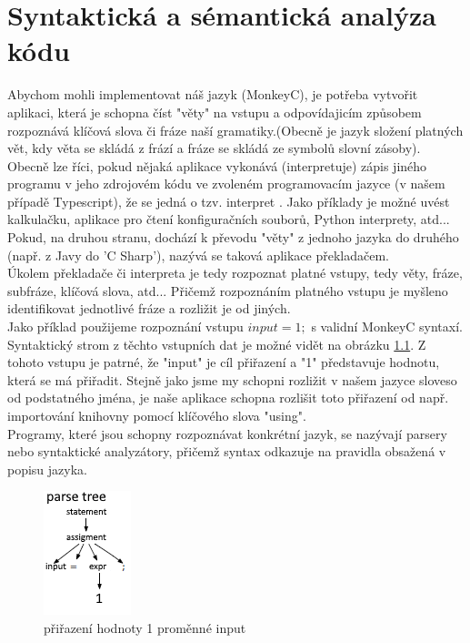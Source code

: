 \chapter{Syntaktická a sémantická analýza kódu}
Abychom mohli implementovat náš jazyk (MonkeyC), je potřeba vytvořit aplikaci, která je schopna číst "věty" na vstupu a odpovídajicím způsobem rozpoznává klíčová slova či fráze naší gramatiky.(Obecně je jazyk složení platných vět, kdy věta se skládá z frází a fráze se skládá ze symbolů slovní zásoby).\\
Obecně lze říci, pokud nějaká aplikace vykonává (interpretuje) zápis jiného programu v jeho zdrojovém kódu ve zvoleném programovacím jazyce (v našem případě Typescript), že se jedná o tzv. interpret \cite{Interpret_2020}. Jako příklady je možné uvést kalkulačku, aplikace pro čtení konfiguračních souborů, Python interprety, atd... Pokud, na druhou stranu, dochází k převodu "věty" z jednoho jazyka do druhého (např. z Javy do 'C Sharp'), nazývá se taková aplikace překladačem.\\
Úkolem překladače či interpreta je tedy rozpoznat platné vstupy, tedy věty, fráze, subfráze, klíčová slova, atd... Přičemž rozpoznáním platného vstupu je myšleno identifikovat jednotlivé fráze a rozližit je od jiných.\\
Jako příklad použijeme rozpoznání vstupu $input = 1;$ s validní MonkeyC syntaxí. Syntaktický strom z těchto vstupních dat je možné vidět na obrázku \ref{img:assigment}. Z tohoto vstupu je patrné, že "input" je cíl přiřazení a "1" představuje hodnotu, která se má přiřadit. Stejně jako jsme my schopni rozližit v našem jazyce sloveso od podstatného jména, je naše aplikace schopna rozlišit toto přiřazení od např. importování knihovny pomocí klíčového slova "using".\\
Programy, které jsou schopny rozpoznávat konkrétní jazyk, se nazývají parsery nebo syntaktické analyzátory, přičemž syntax odkazuje na pravidla obsažená v popisu jazyka.\\

\begin{figure}[b!]
	\centering
	\includegraphics[scale=1.5]{images/assigment}
	 \caption{přiřazení hodnoty 1 proměnné input}
	 \label{img:assigment}
\end{figure}


